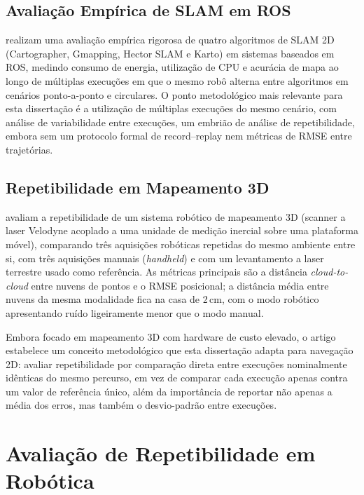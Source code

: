 \subsection{Avaliação Empírica de SLAM em ROS}

 realizam uma avaliação empírica rigorosa de quatro algoritmos
de SLAM 2D (Cartographer, Gmapping, Hector SLAM \cite{kohlbrecher2011} e Karto) em
sistemas baseados em ROS, medindo consumo de energia, utilização de CPU e acurácia de mapa ao longo de
múltiplas execuções em que o mesmo robô alterna entre algoritmos em cenários
ponto-a-ponto e circulares. O ponto metodológico mais relevante para esta
dissertação é a utilização de múltiplas execuções do mesmo cenário, com análise
de variabilidade entre execuções, um embrião de análise de repetibilidade,
embora sem um protocolo formal de record--replay nem métricas de RMSE entre
trajetórias.

\subsection{Repetibilidade em Mapeamento 3D}

 avaliam a repetibilidade de um sistema robótico de mapeamento
3D (scanner a laser Velodyne acoplado a uma unidade de medição inercial sobre uma
plataforma móvel), comparando três aquisições robóticas repetidas do mesmo ambiente
entre si, com três aquisições manuais (\textit{handheld}) e com um levantamento a
laser terrestre usado como referência. As métricas principais são a distância
\textit{cloud-to-cloud} entre nuvens de pontos e o RMSE posicional; a distância
média entre nuvens da mesma modalidade fica na casa de 2\,cm, com o modo robótico
apresentando ruído ligeiramente menor que o modo manual.

Embora focado em mapeamento 3D com hardware de custo elevado, o artigo estabelece
um conceito metodológico que esta dissertação adapta para navegação 2D: avaliar
repetibilidade por comparação direta entre execuções nominalmente idênticas do
mesmo percurso, em vez de comparar cada execução apenas contra um valor de
referência único, além da importância de reportar não apenas a média dos erros,
mas também o desvio-padrão entre execuções.

\section{Avaliação de Repetibilidade em Robótica}
\label{sec:rel_repeticao}

